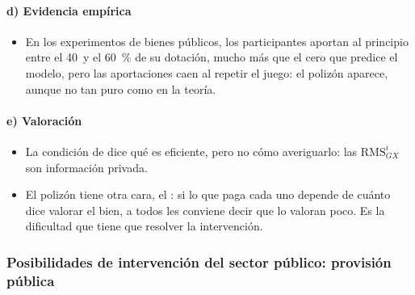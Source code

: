 \documentclass[11pt]{article}
\begin{document}
\paragraph{d) Evidencia empírica}
\begin{itemize}
\item En los experimentos de bienes públicos, los participantes aportan al principio entre el 40~y el 60~\% de su dotación, mucho más que el cero que predice el modelo, pero las aportaciones caen al repetir el juego\nocite{Ledyard1995Public}: el polizón aparece, aunque no tan puro como en la teoría.
\end{itemize}

\paragraph{e) Valoración}
\begin{itemize}
\item La condición de  dice qué es eficiente, pero no cómo averiguarlo: las $\mathrm{RMS}^i_{GX}$ son información privada.
\item El polizón tiene otra cara, el : si lo que paga cada uno depende de cuánto dice valorar el bien, a todos les conviene decir que lo valoran poco. Es la dificultad que tiene que resolver la intervención.
\end{itemize}

\subsubsection{Posibilidades de intervención del sector público: provisión pública}\label{sec:provision-publica}
\end{document}
